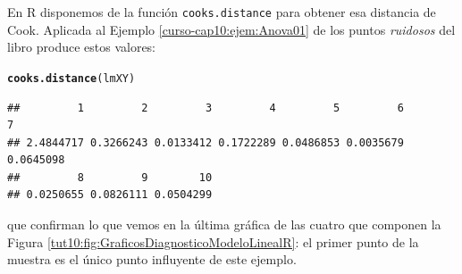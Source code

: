 \documentclass[10pt,a4paper]{article}\usepackage[]{graphicx}\usepackage[]{color}
\makeatletter
\newcommand{\hlstd}[1]{\textcolor[rgb]{0.345,0.345,0.345}{#1}}%
\newcommand{\hlkwd}[1]{\textcolor[rgb]{0.737,0.353,0.396}{\textbf{#1}}}%
\newenvironment{kframe}{%
 \def\at@end@of@kframe{}%
 \ifinner\ifhmode%
  \def\at@end@of@kframe{\end{minipage}}%
  \begin{minipage}{\columnwidth}%
 \fi\fi%
 \def\FrameCommand##1{\hskip\@totalleftmargin \hskip-\fboxsep
 \colorbox{shadecolor}{##1}\hskip-\fboxsep
     \hskip-\linewidth \hskip-\@totalleftmargin \hskip\columnwidth}%
 \MakeFramed {\advance\hsize-\width
   \@totalleftmargin\z@ \linewidth\hsize
   \@setminipage}}%
 {\par\unskip\endMakeFramed%
 \at@end@of@kframe}
\newenvironment{knitrout}{}{} %
\makeatother
\begin{document}
En R disponemos de la función {\tt cooks.distance} para obtener esa distancia de Cook. Aplicada al Ejemplo \ref{curso-cap10:ejem:Anova01} de los puntos {\em ruidosos} del libro produce estos valores:
\begin{knitrout}
\color{fgcolor}\begin{kframe}
\begin{alltt}
\hlkwd{cooks.distance}\hlstd{(lmXY)}
\end{alltt}
\begin{verbatim}
##         1         2         3         4         5         6         7 
## 2.4844717 0.3266243 0.0133412 0.1722289 0.0486853 0.0035679 0.0645098 
##         8         9        10 
## 0.0250655 0.0826111 0.0504299
\end{verbatim}
\end{kframe}
\end{knitrout}
que confirman lo que vemos en la última gráfica de las cuatro que componen la Figura \ref{tut10:fig:GraficosDiagnosticoModeloLinealR}: el primer punto de la muestra es el único punto influyente de este ejemplo.
\end{document}
